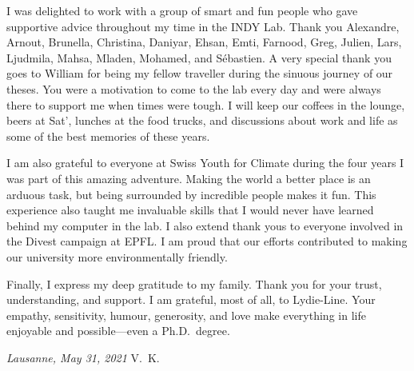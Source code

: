 I was delighted to work with a group of smart and fun people who gave supportive advice throughout my time in the INDY Lab.
Thank you
Alexandre,
Arnout,
Brunella,
Christina,
Daniyar,
Ehsan,
Emti,
Farnood,
Greg,
Julien,
Lars,
Ljudmila,
Mahsa,
Mladen,
Mohamed,
and Sébastien.
A very special thank you goes to William for being my fellow traveller during the sinuous journey of our theses.
You were a motivation to come to the lab every day and were always there to support me when times were tough.
I will keep our coffees in the lounge, beers at Sat', lunches at the food trucks, and discussions about work and life as some of the best memories of these years.

I am also grateful to everyone at Swiss Youth for Climate during the four years I was part of this amazing adventure.
Making the world a better place is an arduous task, but being surrounded by incredible people makes it fun.
This experience also taught me invaluable skills that I would never have learned behind my computer in the lab.
I also extend thank yous to everyone involved in the Divest campaign at EPFL.
I am proud that our efforts contributed to making our university more environmentally friendly.

Finally, I express my deep gratitude to my family.
Thank you for your trust, understanding, and support.
I am grateful, most of all, to Lydie-Line.
Your empathy, sensitivity, humour, generosity, and love make everything in life enjoyable and possible---even a Ph.D.\ degree.

\bigskip

\noindent\textit{Lausanne, May 31, 2021}
\hfill V.~K.
